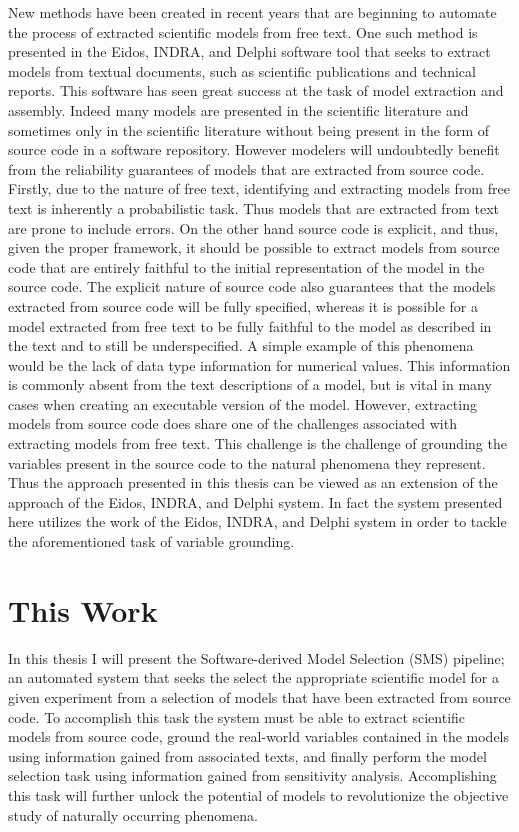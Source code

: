 New methods have been created in recent years that are beginning to automate the process of extracted scientific models from free text. One such method is presented in the Eidos, INDRA, and Delphi software tool that seeks to extract models from textual documents, such as scientific publications and technical reports. This software has seen great success at the task of model extraction and assembly. Indeed many models are presented in the scientific literature and sometimes only in the scientific literature without being present in the form of source code in a software repository. However modelers will undoubtedly benefit from the reliability guarantees of models that are extracted from source code. Firstly, due to the nature of free text, identifying and extracting models from free text is inherently a probabilistic task. Thus models that are extracted from text are prone to include errors. On the other hand source code is explicit, and thus, given the proper framework, it should be possible to extract models from source code that are entirely faithful to the initial representation of the model in the source code. The explicit nature of source code also guarantees that the models extracted from source code will be fully specified, whereas it is possible for a model extracted from free text to be fully faithful to the model as described in the text and to still be underspecified. A simple example of this phenomena would be the lack of data type information for numerical values. This information is commonly absent from the text descriptions of a model, but is vital in many cases when creating an executable version of the model. However, extracting models from source code does share one of the challenges associated with extracting models from free text. This challenge is the challenge of grounding the variables present in the source code to the natural phenomena they represent. Thus the approach presented in this thesis can be viewed as an extension of the approach of the Eidos, INDRA, and Delphi system. In fact the system presented here utilizes the work of the Eidos, INDRA, and Delphi system in order to tackle the aforementioned task of variable grounding.

\section{This Work\label{sec:this_work}}
In this thesis I will present the Software-derived Model Selection (SMS) pipeline; an automated system that seeks the select the appropriate scientific model for a given experiment from a selection of models that have been extracted from source code. To accomplish this task the system must be able to extract scientific models from source code, ground the real-world variables contained in the models using information gained from associated texts, and finally perform the model selection task using information gained from sensitivity analysis. Accomplishing this task will further unlock the potential of models to revolutionize the objective study of naturally occurring phenomena.

